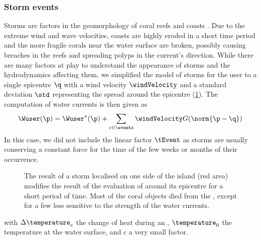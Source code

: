 \subsubsection{Storm events}
Storms are factors in the geomorphology of coral reefs \cite{VilaConcejo2016, Oron2023} and coasts \cite{Dominguez2005, Cowart2010}. Due to the extreme wind and wave velocities, coasts are highly eroded in a short time period and the more fragile corals near the water surface are broken, possibly causing breaches in the reefs and spreading polyps in the current's direction. While there are many factors at play to understand the appearance of storms and the hydrodynamics affecting them, we simplified the model of storms for the user to a single epicentre $\q$ with a wind velocity $\windVelocity$ and a standard deviation $\std$ representing the spread around the epicentre (\cref{fig:env-obj-storm-event}). The computation of water currents is then given as
\begin{align*}
    \Wuser(\p) = \Wuser^*(\p) + \sum_{e \in \events} {\windVelocity G(\norm{\p - \q})}
\end{align*}
In this case, we did not include the linear factor $\tEvent$ as storms are usually conserving a constant force for the time of the few weeks or months of their occurrence. 

\begin{figure}
    \caption{The result of a storm localised on one side of the island (red area) modifies the result of the evaluation of  around its epicentre for a short period of time. Most of the coral objects died from the , except for a few  less sensitive to the strength of the water currents.}
    \label{fig:env-obj-storm-event}
\end{figure}

with $\Delta \temperature_e$ the change of heat during an , $\temperature_0$ the temperature at the water surface, and $c$ a very small factor.

